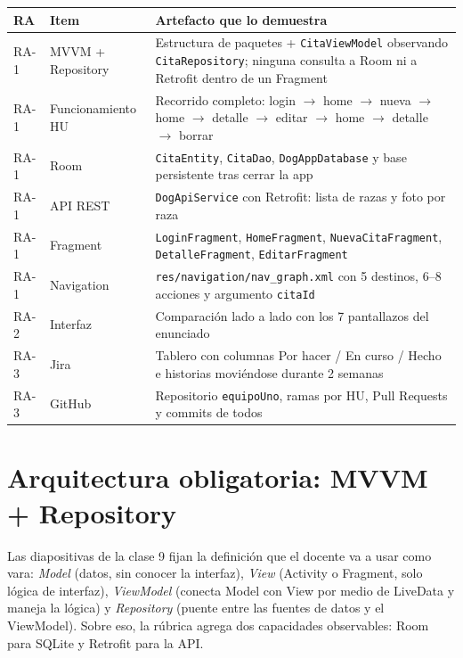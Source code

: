 \documentclass[11pt,letterpaper]{article}
\newcommand{\code}[1]{\texttt{\small #1}}
\begin{document}
\begin{center}
\small
\begin{xltabular}{\linewidth}{@{}l l X@{}}
\toprule
\textbf{RA} & \textbf{Item} & \textbf{Artefacto que lo demuestra}\\
\midrule
\endhead
\bottomrule
\endlastfoot
RA-1 & MVVM + Repository & Estructura de paquetes + \code{CitaViewModel} observando \code{CitaRepository}; ninguna consulta a Room ni a Retrofit dentro de un Fragment\\
RA-1 & Funcionamiento HU & Recorrido completo: login $\to$ home $\to$ nueva $\to$ home $\to$ detalle $\to$ editar $\to$ home $\to$ detalle $\to$ borrar\\
RA-1 & Room & \code{CitaEntity}, \code{CitaDao}, \code{DogAppDatabase} y base persistente tras cerrar la app\\
RA-1 & API REST & \code{DogApiService} con Retrofit: lista de razas y foto por raza\\
RA-1 & Fragment & \code{LoginFragment}, \code{HomeFragment}, \code{NuevaCitaFragment}, \code{DetalleFragment}, \code{EditarFragment}\\
RA-1 & Navigation & \code{res/navigation/\allowbreak{}nav\_graph.\allowbreak{}xml} con 5 destinos, 6--8 acciones y argumento \code{citaId}\\
RA-2 & Interfaz & Comparaci\'on lado a lado con los 7 pantallazos del enunciado\\
RA-3 & Jira & Tablero con columnas Por hacer / En curso / Hecho e historias movi\'endose durante 2 semanas\\
RA-3 & GitHub & Repositorio \code{equipoUno}, ramas por HU, Pull Requests y commits de todos\\
\end{xltabular}
\end{center}

\section{Arquitectura obligatoria: MVVM + Repository}
\label{sec:mvvm}

Las diapositivas de la clase 9 fijan la definici\'on que el docente va a usar como
vara: \emph{Model} (datos, sin conocer la interfaz), \emph{View} (Activity o
Fragment, solo l\'ogica de interfaz), \emph{ViewModel} (conecta Model con View por
medio de LiveData y maneja la l\'ogica) y \emph{Repository} (puente entre las
fuentes de datos y el ViewModel). Sobre eso, la r\'ubrica agrega dos capacidades
observables: Room para SQLite y Retrofit para la API.
\end{document}
